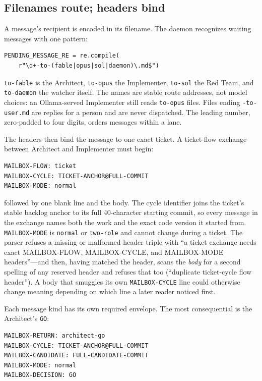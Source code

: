 \documentclass[10pt,aps,prd,twocolumn,nofootinbib]{revtex4-2}
\newcommand{\code}[1]{\texttt{#1}}
\begin{document}
\subsection{Filenames route; headers bind}

A message's recipient is encoded in its filename.  The daemon
recognizes waiting messages with one pattern:

\begin{verbatim}
PENDING_MESSAGE_RE = re.compile(
    r"\d+-to-(fable|opus|sol|daemon)\.md$")
\end{verbatim}

\code{to-fable} is the Architect, \code{to-opus} the Implementer,
\code{to-sol} the Red Team, and \code{to-daemon} the watcher itself.
The names are stable route addresses, not model choices: an
Ollama-served Implementer still reads \code{to-opus} files.  Files
ending \code{-to-user.md} are replies for a person and are never
dispatched.  The leading number, zero-padded to four digits, orders
messages within a lane.

The headers then bind the message to one exact ticket.  A ticket-flow
exchange between Architect and Implementer must begin:

\begin{verbatim}
MAILBOX-FLOW: ticket
MAILBOX-CYCLE: TICKET-ANCHOR@FULL-COMMIT
MAILBOX-MODE: normal
\end{verbatim}

\noindent followed by one blank line and the body.  The cycle
identifier joins the ticket's stable backlog anchor to its full
40-character starting commit, so every message in the exchange names
both the work and the exact code version it started from.
\code{MAILBOX-MODE} is \code{normal} or \code{two-role} and cannot
change during a ticket.  The parser refuses a missing or malformed
header triple with ``a ticket exchange needs exact MAILBOX-FLOW,
MAILBOX-CYCLE, and MAILBOX-MODE headers''---and then, having matched
the header, scans the \emph{body} for a second spelling of any
reserved header and refuses that too (``duplicate ticket-cycle flow
header'').  A body that smuggles its own \code{MAILBOX-CYCLE} line
could otherwise change meaning depending on which line a later reader
noticed first.

Each message kind has its own required envelope.  The most
consequential is the Architect's \code{GO}:

\begin{verbatim}
MAILBOX-RETURN: architect-go
MAILBOX-CYCLE: TICKET-ANCHOR@FULL-COMMIT
MAILBOX-CANDIDATE: FULL-CANDIDATE-COMMIT
MAILBOX-MODE: normal
MAILBOX-DECISION: GO
\end{verbatim}
\end{document}
